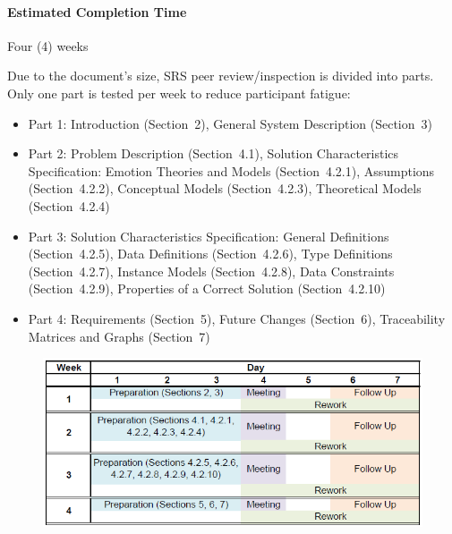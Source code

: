 \paragraph{Estimated Completion Time} Four (4) weeks

Due to the document's size, SRS peer review/inspection is divided into parts.
Only one part is tested per week to reduce participant fatigue:
\begin{itemize}

    \item Part 1: Introduction (Section~2), General System Description
    (Section~3)

    \item Part 2: Problem Description (Section~4.1), Solution Characteristics
    Specification: Emotion Theories and Models (Section~4.2.1), Assumptions
    (Section~4.2.2), Conceptual Models (Section~4.2.3), Theoretical Models
    (Section~4.2.4)

    \item Part 3: Solution Characteristics Specification: General Definitions
    (Section~4.2.5), Data Definitions (Section~4.2.6), Type Definitions
    (Section~4.2.7), Instance Models (Section~4.2.8), Data Constraints
    (Section~4.2.9), Properties of a Correct Solution (Section~4.2.10)

    \item Part 4: Requirements (Section~5), Future Changes (Section~6),
    Traceability Matrices and Graphs (Section~7)

\end{itemize}

\begin{figure}[!h]
    \centering
    \includegraphics[width=0.9\linewidth]{figures/Requirements_Schedule.png}
\end{figure}
